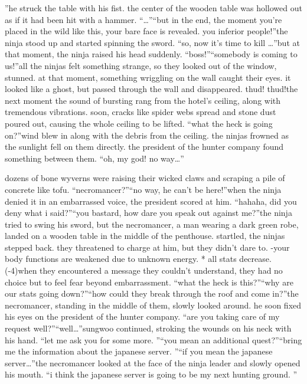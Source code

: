 ”he struck the table with his fist.
 the center of the wooden table was hollowed out as if it had been hit with a hammer.
“…”“but in the end, the moment you’re placed in the wild like this, your bare face is revealed.
 you inferior people!”the ninja stood up and started spinning the sword.
“so, now it’s time to kill …”but at that moment, the ninja raised his head suddenly.
“boss!”“somebody is coming to us!”all the ninjas felt something strange, so they looked out of the window, stunned.
at that moment, something wriggling on the wall caught their eyes.
it looked like a ghost, but passed through the wall and disappeared.
thud! thud!the next moment the sound of bursting rang from the hotel’s ceiling, along with tremendous vibrations.
 soon, cracks like spider webs spread and stone dust poured out, causing the whole ceiling to be lifted.
“what the heck is going on?”wind blew in along with the debris from the ceiling.
 the ninjas frowned as the sunlight fell on them directly.
 the president of the hunter company found something between them.
“oh, my god! no way…”

dozens of bone wyverns were raising their wicked claws and scraping a pile of concrete like tofu.
“necromancer?”“no way, he can’t be here!”when the ninja denied it in an embarrassed voice, the president scored at him.
“hahaha, did you deny what i said?”“you bastard, how dare you speak out against me?”the ninja tried to swing his sword, but the necromancer, a man wearing a dark green robe, landed on a wooden table in the middle of the penthouse.
startled, the ninjas stepped back.
 they threatened to charge at him, but they didn’t dare to.
-your body functions are weakened due to unknown energy.
* all stats decrease.
 (-4)when they encountered a message they couldn’t understand, they had no choice but to feel fear beyond embarrassment.
“what the heck is this?”“why are our stats going down?”“how could they break through the roof and come in?”the necromancer, standing in the middle of them, slowly looked around.
he soon fixed his eyes on the president of the hunter company.
“are you taking care of my request well?”“well…”sungwoo continued, stroking the wounds on his neck with his hand.
“let me ask you for some more.
”“you mean an additional quest?”“bring me the information about the japanese server.
”“if you mean the japanese server…”the necromancer looked at the face of the ninja leader and slowly opened his mouth.
“i think the japanese server is going to be my next hunting ground.
”

 
